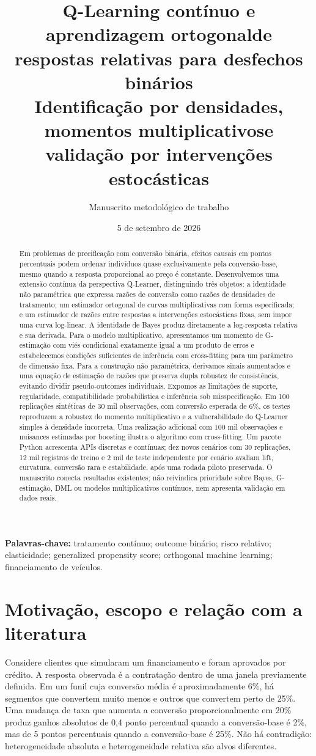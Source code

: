 \documentclass[11pt,a4paper]{article}
\title{\vspace{-0.9cm}\textbf{Q-Learning contínuo e aprendizagem ortogonal\newline de respostas relativas para desfechos binários}\\[0.4em]
\large Identificação por densidades, momentos multiplicativos\newline e validação por intervenções estocásticas}
\author{Manuscrito metodológico de trabalho}
\date{5 de setembro de 2026}
\begin{document}
\maketitle
\thispagestyle{empty}
\begin{abstract}
Em problemas de precificação com conversão binária, efeitos causais em pontos percentuais podem ordenar indivíduos quase exclusivamente pela conversão-base, mesmo quando a resposta proporcional ao preço é constante. Desenvolvemos uma extensão contínua da perspectiva Q-Learner, distinguindo três objetos: a identidade não paramétrica que expressa razões de conversão como razões de densidades de tratamento; um estimador ortogonal de curvas multiplicativas com forma especificada; e um estimador de razões entre respostas a intervenções estocásticas fixas, sem impor uma curva log-linear. A identidade de Bayes produz diretamente a log-resposta relativa e sua derivada. Para o modelo multiplicativo, apresentamos um momento de G-estimação com viés condicional exatamente igual a um produto de erros e estabelecemos condições suficientes de inferência com cross-fitting para um parâmetro de dimensão fixa. Para a construção não paramétrica, derivamos sinais aumentados e uma equação de estimação de razões que preserva dupla robustez de consistência, evitando dividir pseudo-outcomes individuais. Expomos as limitações de suporte, regularidade, compatibilidade probabilística e inferência sob misspecificação. Em 100 replicações sintéticas de 30 mil observações, com conversão esperada de 6\%, os testes reproduzem a robustez do momento multiplicativo e a vulnerabilidade do Q-Learner simples à densidade incorreta. Uma realização adicional com 100 mil observações e nuisances estimadas por boosting ilustra o algoritmo com cross-fitting. Um pacote Python acrescenta APIs discretas e contínuas; dez novos cenários com 30 replicações, 12 mil registros de treino e 2 mil de teste independente por cenário avaliam lift, curvatura, conversão rara e estabilidade, após uma rodada piloto preservada. O manuscrito conecta resultados existentes; não reivindica prioridade sobre Bayes, G-estimação, DML ou modelos multiplicativos contínuos, nem apresenta validação em dados reais.
\end{abstract}
\noindent\textbf{Palavras-chave:} tratamento contínuo; outcome binário; risco relativo; elasticidade; generalized propensity score; orthogonal machine learning; financiamento de veículos.

\section{Motivação, escopo e relação com a literatura}
\label{sec:intro}
Considere clientes que simularam um financiamento e foram aprovados por crédito. A resposta observada é a contratação dentro de uma janela previamente definida. Em um funil cuja conversão média é aproximadamente 6\%, há segmentos que convertem muito menos e outros que convertem perto de 25\%. Uma mudança de taxa que aumenta a conversão proporcionalmente em 20\% produz ganhos absolutos de 0,4 ponto percentual quando a conversão-base é 2\%, mas de 5 pontos percentuais quando a conversão-base é 25\%. Não há contradição: heterogeneidade absoluta e heterogeneidade relativa são alvos diferentes.
\end{document}

